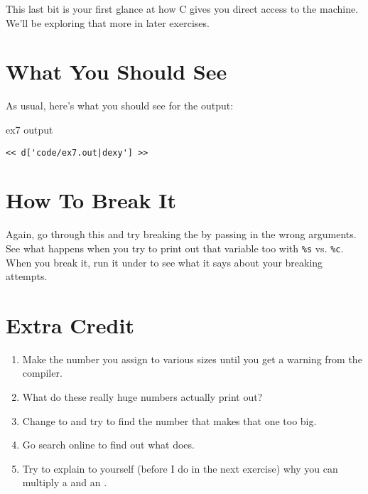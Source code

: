 This last bit is your first glance at how C gives you direct access to 
the machine.  We'll be exploring that more in later exercises.


\section{What You Should See}

As usual, here's what you should see for the output:

\begin{code}{ex7 output}
\begin{lstlisting}
<< d['code/ex7.out|dexy'] >>
\end{lstlisting}
\end{code}


\section{How To Break It}

Again, go through this and try breaking the  by passing in
the wrong arguments.  See what happens when you try to print out that
 variable too with \verb|%s| vs. \verb|%c|.  When you
break it, run it under  to see what it says about your
breaking attempts.

\section{Extra Credit}

\begin{enumerate}
\item Make the number you assign to  various 
    sizes until you get a warning from the compiler.
\item What do these really huge numbers actually print out?
\item Change  to  and try to find 
    the number that makes that one too big.
\item Go search online to find out what  does.
\item Try to explain to yourself (before I do in the next exercise)
    why you can multiply a  and an .
\end{enumerate}

